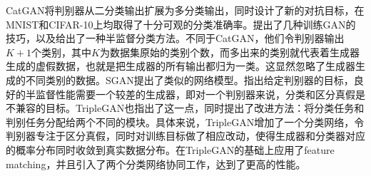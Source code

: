 %

CatGAN\cite{springenberg2015unsupervised}将判别器从二分类输出扩展为多分类输出，同时设计了新的对抗目标，在MNIST\cite{lecun1989backpropagation}和CIFAR-10\cite{krizhevsky2009learning}上均取得了十分可观的分类准确率。\citet{salimans2016improved}提出了几种训练GAN的技巧，以及给出了一种半监督分类方法。不同于CatGAN，他们令判别器输出$K+1$个类别，其中$K$为数据集原始的类别个数，而多出来的类别就代表着生成器生成的虚假数据，也就是把生成器的所有输出都归为一类。这显然忽略了生成器生成的不同类别的数据。SGAN\cite{odena2016semi}提出了类似的网络模型。\citet{dai2017good}指出给定判别器的目标，良好的半监督性能需要一个较差的生成器，即对一个判别器来说，分类和区分真假是不兼容的目标。TripleGAN\cite{chongxuan2017triple}也指出了这一点，同时提出了改进方法：将分类任务和判别任务分配给两个不同的模块。具体来说，TripleGAN增加了一个分类网络，令判别器专注于区分真假，同时对训练目标做了相应改动，使得生成器和分类器对应的概率分布同时收敛到真实数据分布。\citet{wu2019enhancing}在TripleGAN的基础上应用了feature matching\cite{salimans2016improved}，并且引入了两个分类网络协同工作，达到了更高的性能。


